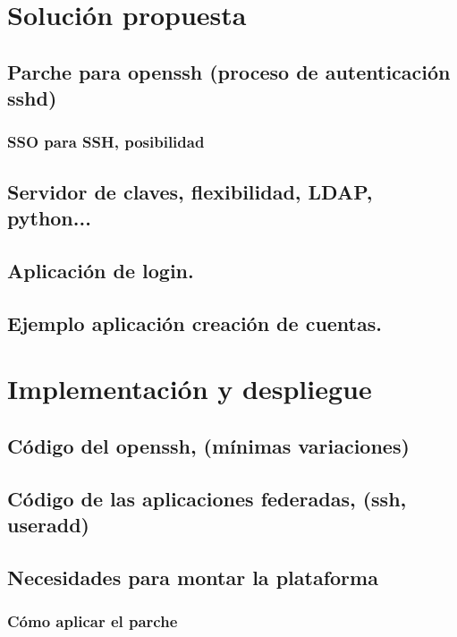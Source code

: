 

\tableofcontents






\chapter{Solución propuesta}
    \section{Parche para openssh (proceso de autenticación sshd)}
    \label{openssh}
        \subsection{SSO para SSH, posibilidad}
    \section{Servidor de claves, flexibilidad, LDAP, python...}
    \section{Aplicación de login.}
    \section{Ejemplo aplicación creación de cuentas.}


\chapter{Implementación y despliegue}
    \label{implementacion}
    \section{Código del openssh, (mínimas variaciones)}
    \section{Código de las aplicaciones federadas, (ssh, useradd)}
    \section{Necesidades para montar la plataforma}
        \subsection{Cómo aplicar el parche}
